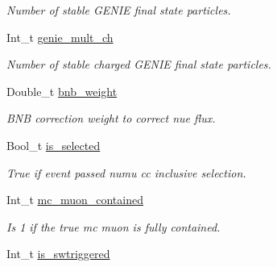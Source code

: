 \begin{DoxyCompactItemize}
\begin{DoxyCompactList}\small\item\em Number of stable G\-E\-N\-I\-E final state particles. \end{DoxyCompactList}\item 
\hypertarget{classUBXSecEvent_a6a73137488dc2af0dc6abd5868fbbe4d}{Int\-\_\-t \hyperlink{classUBXSecEvent_a6a73137488dc2af0dc6abd5868fbbe4d}{genie\-\_\-mult\-\_\-ch}}\label{classUBXSecEvent_a6a73137488dc2af0dc6abd5868fbbe4d}

\begin{DoxyCompactList}\small\item\em Number of stable charged G\-E\-N\-I\-E final state particles. \end{DoxyCompactList}\item 
\hypertarget{classUBXSecEvent_a38aa9da115c68ecd02cfa2da1f2d50a2}{Double\-\_\-t \hyperlink{classUBXSecEvent_a38aa9da115c68ecd02cfa2da1f2d50a2}{bnb\-\_\-weight}}\label{classUBXSecEvent_a38aa9da115c68ecd02cfa2da1f2d50a2}

\begin{DoxyCompactList}\small\item\em B\-N\-B correction weight to correct nue flux. \end{DoxyCompactList}\item 
\hypertarget{classUBXSecEvent_a6af1830fbdf3bb5df9087095941cf8ec}{Bool\-\_\-t \hyperlink{classUBXSecEvent_a6af1830fbdf3bb5df9087095941cf8ec}{is\-\_\-selected}}\label{classUBXSecEvent_a6af1830fbdf3bb5df9087095941cf8ec}

\begin{DoxyCompactList}\small\item\em True if event passed numu cc inclusive selection. \end{DoxyCompactList}\item 
\hypertarget{classUBXSecEvent_a350303f94db8bcfdbc2e517713d7ebf9}{Int\-\_\-t \hyperlink{classUBXSecEvent_a350303f94db8bcfdbc2e517713d7ebf9}{mc\-\_\-muon\-\_\-contained}}\label{classUBXSecEvent_a350303f94db8bcfdbc2e517713d7ebf9}

\begin{DoxyCompactList}\small\item\em Is 1 if the true mc muon is fully contained. \end{DoxyCompactList}\item 
\hypertarget{classUBXSecEvent_aedee1ade9f68dfb32fba0b943125f52d}{Int\-\_\-t \hyperlink{classUBXSecEvent_aedee1ade9f68dfb32fba0b943125f52d}{is\-\_\-swtriggered}}\label{classUBXSecEvent_aedee1ade9f68dfb32fba0b943125f52d}


\end{DoxyCompactItemize}
